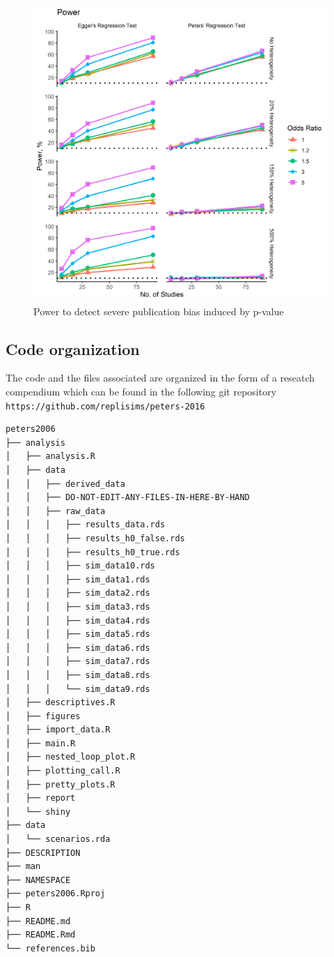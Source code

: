 \documentclass[
  english,
  doc,floatsintext,draftall]{apa6}
\begin{document}
\begin{figure}
\includegraphics[width=400pt]{../figures/power_es_moderate} \caption{Power to detect severe publication bias induced by p-value}\label{fig:unnamed-chunk-7}
\end{figure}

\hypertarget{code-organization}{%
\subsection{Code organization}\label{code-organization}}

The code and the files associated are organized in the form of a reseatch compendium
which can be found in the following git repository \texttt{https://github.com/replisims/peters-2016}
\FloatBarrier

\begin{minipage}{\linewidth}
\begin{verbatim}
peters2006
├── analysis
│   ├── analysis.R
│   ├── data
│   │   ├── derived_data
│   │   ├── DO-NOT-EDIT-ANY-FILES-IN-HERE-BY-HAND
│   │   ├── raw_data
│   │   │   ├── results_data.rds
│   │   │   ├── results_h0_false.rds
│   │   │   ├── results_h0_true.rds
│   │   │   ├── sim_data10.rds
│   │   │   ├── sim_data1.rds
│   │   │   ├── sim_data2.rds
│   │   │   ├── sim_data3.rds
│   │   │   ├── sim_data4.rds
│   │   │   ├── sim_data5.rds
│   │   │   ├── sim_data6.rds
│   │   │   ├── sim_data7.rds
│   │   │   ├── sim_data8.rds
│   │   │   └── sim_data9.rds
│   ├── descriptives.R
│   ├── figures
│   ├── import_data.R
│   ├── main.R
│   ├── nested_loop_plot.R
│   ├── plotting_call.R
│   ├── pretty_plots.R
│   ├── report
│   └── shiny
├── data
│   └── scenarios.rda
├── DESCRIPTION
├── man
├── NAMESPACE
├── peters2006.Rproj
├── R
├── README.md
├── README.Rmd
└── references.bib
\end{verbatim}
\end{minipage}
\end{document}

